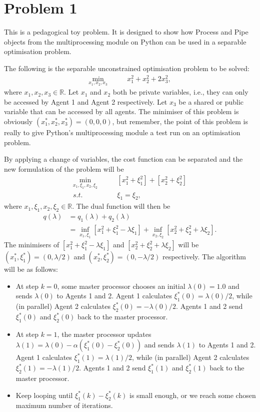\documentclass[12pt]{article}
\begin{document}
\section*{Problem 1}

This is a pedagogical toy problem. It is designed to show how Process and Pipe objects from the multiprocessing module on Python can be used in a separable optimisation problem.

The following is the separable unconstrained optimisation problem to be solved:
\begin{align*}
\min_{x_1,x_2,x_3}\qquad& x_1^2+x_2^2+2x_3^2,
\end{align*}
where $x_1,x_2,x_3\in\mathbb{R}$. Let $x_1$ and $x_2$ both be private variables, i.e., they can only be accessed by Agent 1 and Agent 2 respectively. Let $x_3$ be a shared or public variable that can be accessed by all agents. The minimiser of this problem is obviously $(x_1^*,x_2^*,x_3^*)=(0,0,0)$, but remember, the point of this problem is really to give Python's multiprocessing module a test run on an optimisation problem. 

By applying a change of variables, the cost function can be separated and the new formulation of the problem will be
\begin{align*}
\min_{x_1,\xi_1,x_2,\xi_2}\qquad& [x_1^2+\xi_1^2]+[x_2^2+\xi_2^2]\\
s.t.\qquad&\xi_1=\xi_2,
\end{align*}
where $x_1,\xi_1,x_2,\xi_2\in\mathbb{R}$. The dual function will then be
\begin{align*}
q(\lambda)&=q_1(\lambda)+q_2(\lambda)\\
&=\inf_{x_1,\xi_1}[x_1^2+\xi_1^2-\lambda\xi_1]+\inf_{x_2,\xi_2}[x_2^2+\xi_2^2+\lambda\xi_2].
\end{align*}
The minimisers of $[x_1^2+\xi_1^2-\lambda\xi_1]$ and $[x_2^2+\xi_2^2+\lambda\xi_2]$ will be $(x_1^*,\xi_1^*)=(0,\lambda/2)$ and $(x_2^*,\xi_2^*)=(0,-\lambda/2)$ respectively. The algorithm will be as follows:

\begin{itemize}
	\item At step $k=0$, some master processor chooses an initial $\lambda(0)=1.0$ and sends $\lambda(0)$ to Agents 1 and 2. Agent 1 calculates $\xi_1^*(0)=\lambda(0)/2$, while (in parallel) Agent 2 calculates $\xi_2^*(0)=-\lambda(0)/2$. Agents 1 and 2 send $\xi_1^*(0)$ and $\xi_2^*(0)$ back to the master processor.
	\item At step $k=1$, the master processor updates $\lambda(1)=\lambda(0)-\alpha(\xi_1^*(0)-\xi_2^*(0))$ and sends $\lambda(1)$ to Agents 1 and 2. Agent 1 calculates $\xi_1^*(1)=\lambda(1)/2$, while (in parallel) Agent 2 calculates $\xi_2^*(1)=-\lambda(1)/2$. Agents 1 and 2 send $\xi_1^*(1)$ and $\xi_2^*(1)$ back to the master processor.
	\item Keep looping until $\xi_1^*(k)-\xi_2^*(k)$ is small enough, or we reach some chosen maximum number of iterations.
\end{itemize}
\end{document}
